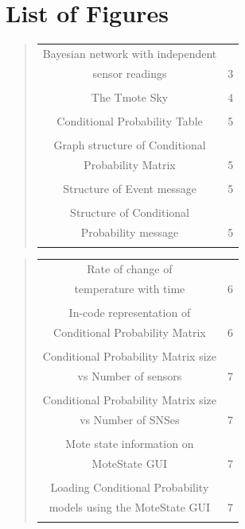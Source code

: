 \documentclass{sig-alternate-10pt}
\begin{document}
\section{List of Figures}

\begin{quote}
\begin{tabular}{cc}
Bayesian network with independent  &  \\
sensor readings & 3\\ \\
The Tmote Sky & 4\\ \\
Conditional Probability Table & 5\\ \\
Graph structure of Conditional & \\
 Probability Matrix & 5 \\ \\
Structure of Event message & 5 \\ \\
Structure of Conditional  & \\
Probability message & 5 \\ \\
 \end{tabular}
\end{quote}
\balancecolumns
\begin{quote}
\begin{tabular}{cc} 
Rate of change of & \\
temperature with time & 6 \\ \\
In-code representation of  &  \\ 
 Conditional Probability Matrix & 6 \\ \\
Conditional Probability Matrix size & \\
vs Number of sensors & 7 \\ \\
Conditional Probability Matrix size & \\
vs Number of SNSes & 7 \\ \\
Mote state information on & \\
 MoteState GUI & 7\\ \\
Loading Conditional Probability & \\
 models using the MoteState GUI & 7 \\ \\ 
\end{tabular}
\end{quote}
\end{document}
